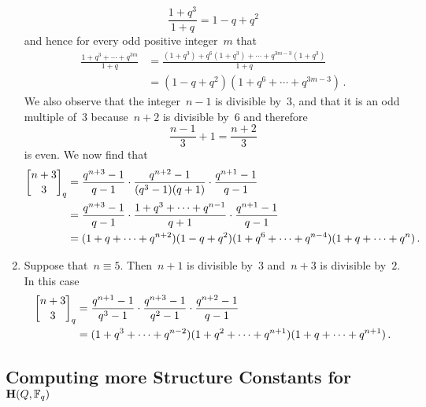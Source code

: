 \documentclass[a4paper,11pt]{scrartcl}
\begin{document}
\begin{enumerate}[label = {Case \arabic*.}]
    \[
      \frac{1 + q^3}{1 + q}
      =
      1 - q + q^2
    \]
    and hence for every odd positive integer~$m$ that
    \begin{align*}
      \frac{1 + q^3 + \dotsb + q^{3m}}{1 + q}
      &=
      \frac{(1 + q^3) + q^6 (1 + q^3) + \dotsb + q^{3m-3} (1 + q^3)}{1 + q}
      \\
      &=
      (1 - q + q^2) (1 + q^6 + \dotsb + q^{3m-3}) \,.
    \end{align*}
    We also observe that the integer~$n-1$ is divisible by~$3$, and that it is an odd multiple of~$3$ because~$n+2$ is divisible by~$6$ and therefore
    \[
      \frac{n-1}{3} + 1
      =
      \frac{n+2}{3}
    \]
    is even.
    We now find that
    \begin{align*}
      \qbinom{n+3}{3}_q
      &=
      \frac{ q^{n+3} - 1 }{ q - 1 }
      \cdot
      \frac{ q^{n+2} - 1 }{ (q^3 - 1)(q + 1) }
      \cdot
      \frac{ q^{n+1} - 1 }{ q - 1 }
      \\
      &=
      \frac{ q^{n+3} - 1 }{ q - 1 }
      \cdot
      \frac{ 1 + q^3 + \dotsb + q^{n-1} }{ q + 1 }
      \cdot
      \frac{ q^{n+1} - 1 }{ q - 1 }
      \\
      &=
      (1 + q + \dotsb + q^{n+2})
      (1 - q + q^2)(1 + q^6 + \dotsb + q^{n-4})
      (1 + q + \dotsb + q^n) \,.
    \end{align*}
  \item
    Suppose that~$n \equiv 5$.
    Then~$n+1$ is divisible by~$3$ and~$n+3$ is divisible by~$2$.
    In this case
    \begin{align*}
      \qbinom{n+3}{3}_q
      &=
      \frac{ q^{n+1} - 1 }{ q^3 - 1 }
      \cdot
      \frac{ q^{n+3} - 1 }{ q^2 - 1 }
      \cdot
      \frac{ q^{n+2} - 1 }{ q - 1 }
      \\
      &=
      (1 + q^3 + \dotsb + q^{n-2}) (1 + q^2 + \dotsb + q^{n+1}) (1 + q + \dotsb + q^{n+1}) \,.
    \end{align*}
\end{enumerate}


\subsection{Computing more Structure Constants for~$\mathbf{H}(Q, \mathbb{F}_q)$}
\label{computing more structure constants}
\end{document}
